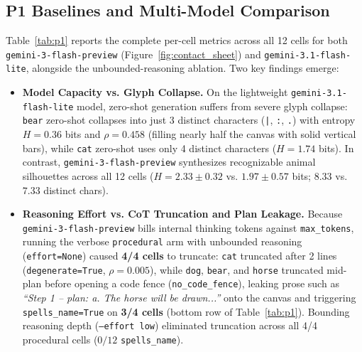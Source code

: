 \documentclass[10pt,twocolumn]{article}
\begin{document}
\subsection{P1 Baselines and Multi-Model Comparison}
Table~\ref{tab:p1} reports the complete per-cell metrics across all 12 cells for both \texttt{gemini-3-flash-preview} (Figure~\ref{fig:contact_sheet}) and \texttt{gemini-3.1-flash-lite}, alongside the unbounded-reasoning ablation. Two key findings emerge:
\begin{itemize}
  \item \textbf{Model Capacity vs. Glyph Collapse.} On the lightweight \texttt{gemini-3.1-flash-lite} model, zero-shot generation suffers from severe glyph collapse: \texttt{bear} zero-shot collapses into just 3 distinct characters (\texttt{|}, \texttt{:}, \texttt{.}) with entropy $H = 0.36$ bits and $\rho = 0.458$ (filling nearly half the canvas with solid vertical bars), while \texttt{cat} zero-shot uses only 4 distinct characters ($H = 1.74$ bits). In contrast, \texttt{gemini-3-flash-preview} synthesizes recognizable animal silhouettes across all 12 cells ($H = 2.33 \pm 0.32$ vs. $1.97 \pm 0.57$ bits; $8.33$ vs. $7.33$ distinct chars).
  \item \textbf{Reasoning Effort vs. CoT Truncation and Plan Leakage.} Because \texttt{gemini-3-flash-preview} bills internal thinking tokens against \texttt{max\_tokens}, running the verbose \texttt{procedural} arm with unbounded reasoning (\texttt{effort=None}) caused \textbf{4/4 cells} to truncate: \texttt{cat} truncated after 2 lines (\texttt{degenerate=True}, $\rho=0.005$), while \texttt{dog}, \texttt{bear}, and \texttt{horse} truncated mid-plan before opening a code fence (\texttt{no\_code\_fence}), leaking prose such as \emph{``Step 1 -- plan: a. The horse will be drawn...''} onto the canvas and triggering \texttt{spells\_name=True} on \textbf{3/4 cells} (bottom row of Table~\ref{tab:p1}). Bounding reasoning depth (\texttt{--effort low}) eliminated truncation across all 4/4 procedural cells ($0/12$ \texttt{spells\_name}).
\end{itemize}
\end{document}

